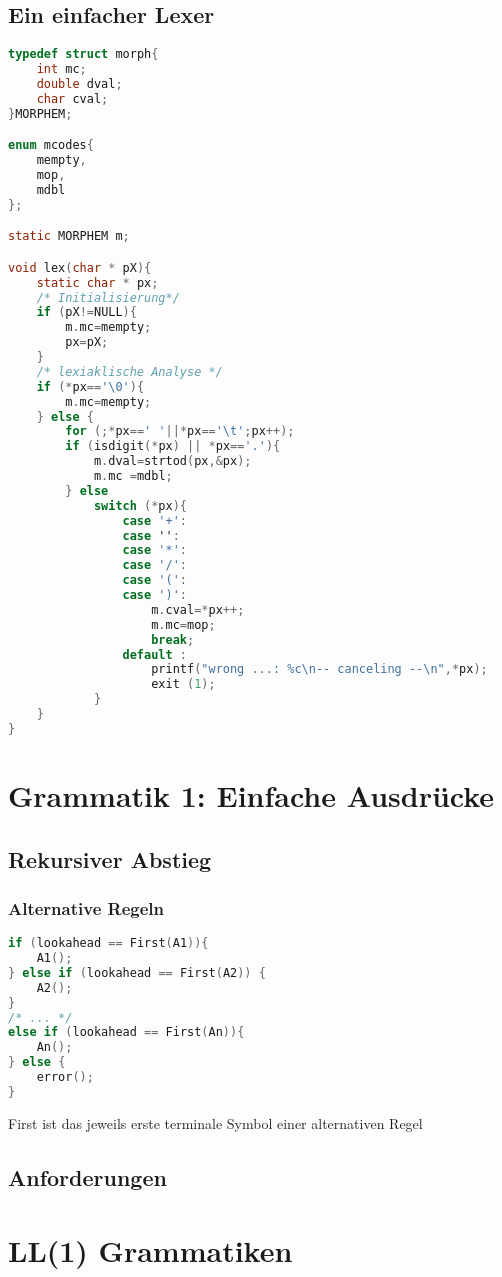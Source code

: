 \subsection{Ein einfacher Lexer}
\begin{lstlisting}[language=C]
typedef struct morph{
	int mc;
	double dval;
	char cval;
}MORPHEM;

enum mcodes{
	mempty,
	mop,
	mdbl
};

static MORPHEM m;

void lex(char * pX){
	static char * px;
	/* Initialisierung*/
	if (pX!=NULL){
		m.mc=mempty;
		px=pX;
	}
	/* lexiaklische Analyse */
	if (*px=='\0'){
		m.mc=mempty;
	} else {
		for (;*px==' '||*px=='\t';px++);
		if (isdigit(*px) || *px=='.'){
			m.dval=strtod(px,&px);
			m.mc =mdbl;
		} else
			switch (*px){
				case '+':
				case '':
				case '*':
				case '/':
				case '(':
				case ')':
					m.cval=*px++;
					m.mc=mop;
					break;
				default :
					printf("wrong ...: %c\n-- canceling --\n",*px);
					exit (1);
			}
	}
}
\end{lstlisting}

\section{Grammatik 1: Einfache Ausdrücke}
\subsection{Rekursiver Abstieg}
\subsubsection*{Alternative Regeln}
\begin{lstlisting}[language=C]
if (lookahead == First(A1)){
	A1();
} else if (lookahead == First(A2)) {
	A2();
}
/* ... */
else if (lookahead == First(An)){
	An();
} else {
	error();
}
\end{lstlisting}
First ist das jeweils erste terminale Symbol einer alternativen
Regel
\subsection{Anforderungen}

\section{LL(1) Grammatiken}

